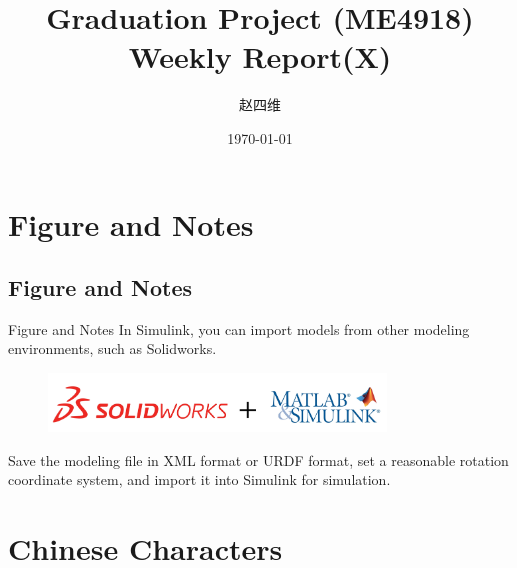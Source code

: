 \documentclass[xcolor=x11names,compress]{ctexbeamer}
\title{ Graduation Project  (ME4918)\\
  \textbf{Weekly Report(X)}}
\author{\selectfont\kaishu 赵四维}
\institute
{
   Institute of Robotics,\\
   School of Mechanical Engineering,SJTU 
}
\date{\mydate\today}
\begin{document}
\maketitle


\section{Figure and Notes}
\subsection{Figure and Notes}

\begin{frame}{Figure and Notes}
In Simulink, you can import models from other modeling environments, such as Solidworks.
\begin{figure}
\includegraphics[width=0.8\textwidth]{Figure/logo.png}
\end{figure}

Save the modeling file in XML format or URDF format, set a reasonable rotation coordinate system, and import it into Simulink for simulation.
\end{frame}

\section{Chinese Characters}
\end{document}
